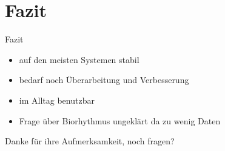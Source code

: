 \section{Fazit}

\begin{frame}{Fazit}
 	\begin{itemize}[<+->]
 	\item auf den meisten Systemen stabil
 	\item bedarf noch Überarbeitung und Verbesserung
 	\item im Alltag benutzbar
 	\item Frage über Biorhythmus ungeklärt da zu wenig Daten
 	\end{itemize}
\end{frame}
\begin{frame}
\vspace{2.5cm}
	\begin{center}
	Danke für ihre Aufmerksamkeit, noch fragen?
	\end{center}
\end{frame}